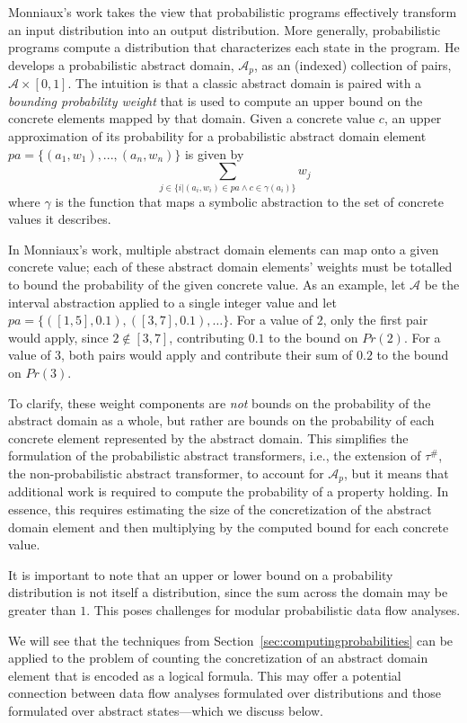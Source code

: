 Monniaux's work takes the view that probabilistic programs 
effectively transform an input distribution into an output
distribution.  More generally, probabilistic programs compute 
a distribution that characterizes each state in the program.   
He develops a probabilistic abstract domain, $\mathcal{A}_p$, 
as an (indexed) collection of pairs, $\mathcal{A} \times [0,1]$.
The intuition is that a classic abstract domain is paired
with a \textit{bounding probability weight} that is used
to compute an upper bound on the concrete elements mapped
by that domain.
Given a concrete value $c$, 
an upper approximation of its probability 
for a probabilistic abstract domain
element $pa = \{(a_1,w_1), ..., (a_n,w_n)\}$
is given by
\[
\sum_{j \in \{ i \vert (a_i,w_i) \in pa \wedge c \in \gamma(a_i)\}} w_j
\]
where $\gamma$ is the function that maps a symbolic abstraction to
the set of concrete values it describes.

In Monniaux's work, multiple abstract domain elements can map onto a given
concrete value; each of these abstract domain elements'
weights must be totalled to bound the probability of
the given concrete value.
As an example, let $\mathcal{A}$ be the interval abstraction
applied to a single integer value
and let $pa = \{([1,5],0.1),([3,7],0.1),\ldots\}$.  
For a value of $2$, only the first pair would apply, since
$2 \not\in [3,7]$, contributing $0.1$ to the bound on $Pr(2)$.
For a value of $3$, both pairs would apply and contribute
their sum of $0.2$ to the bound on $Pr(3)$.

To clarify, these weight components are \textit{not} bounds on the probability
of the abstract domain as a whole, but rather are bounds on the probability
of each concrete element represented by the abstract domain.
This simplifies the formulation of the probabilistic abstract
transformers, i.e., the extension of $\tau^\#$, the non-probabilistic
abstract transformer, to account for 
$\mathcal{A}_p$, but it means that additional
work is required to compute the probability of a property holding.
In essence, this requires estimating the size of the concretization
of the abstract domain element and then multiplying by the computed bound for
each concrete value.  

It is important to note that an upper or lower
bound on a probability distribution
is not itself a distribution, since the sum across the domain
may be greater than $1$.
This poses challenges for modular probabilistic data flow analyses.

We will see that the techniques from 
Section~\ref{sec:computingprobabilities} can be applied to
the problem of counting the concretization of an abstract domain element 
that is encoded as a logical formula.  This may offer a potential
connection between data flow analyses formulated over distributions
and those formulated over abstract states---which we discuss below.

